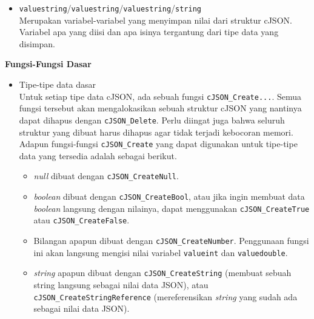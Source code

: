 \documentclass[a4paper,twoside]{article}
\begin{document}
\begin{enumerate}
\begin{itemize}
	\item \verb|valuestring|/\verb|valuestring|/\verb|valuestring|/\verb|string|\\	
	Merupakan variabel-variabel yang menyimpan nilai dari struktur cJSON. Variabel apa yang diisi dan apa isinya tergantung dari tipe data yang disimpan.
\end{itemize}

\textbf{Fungsi-Fungsi Dasar}
\label{sec:cmodules-cJSON-basicfuncts}

\begin{itemize}
	\item Tipe-tipe data dasar\\
	Untuk setiap tipe data cJSON, ada sebuah fungsi \verb|cJSON_Create...|. Semua fungsi tersebut akan mengalokasikan sebuah struktur cJSON yang nantinya dapat dihapus dengan \verb|cJSON_Delete|. Perlu diingat juga bahwa seluruh struktur yang dibuat harus dihapus agar tidak terjadi kebocoran memori. Adapun fungsi-fungsi \verb|cJSON_Create| yang dapat digunakan untuk tipe-tipe data yang tersedia adalah sebagai berikut.
	
	\begin{itemize}
		\item \textit{null} dibuat dengan \verb|cJSON_CreateNull|.
		\item \textit{boolean} dibuat dengan \verb|cJSON_CreateBool|, atau jika ingin membuat data \textit{boolean} langsung dengan nilainya, dapat menggunakan \verb|cJSON_CreateTrue| atau \verb|cJSON_CreateFalse|.
		\item Bilangan apapun dibuat dengan \verb|cJSON_CreateNumber|. Penggunaan fungsi ini akan langsung mengisi nilai variabel \verb|valueint| dan \verb|valuedouble|.
		\item \textit{string} apapun dibuat dengan \verb|cJSON_CreateString| (membuat sebuah string langsung sebagai nilai data JSON), atau \verb|cJSON_CreateStringReference| (mereferensikan \textit{string} yang sudah ada sebagai nilai data JSON).
	\end{itemize}
	

\end{itemize}
\end{enumerate}
\end{document}
